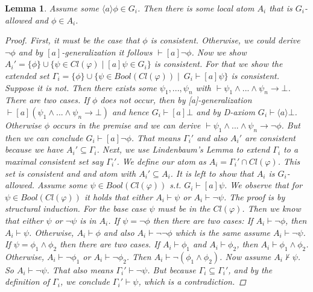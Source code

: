 \documentclass[11pt]{article}
\newtheorem{lemma}[theorem]{Lemma}
\theoremstyle{definition}
\theoremstyle{remark}
\begin{document}
\begin{lemma}
    Assume some $\langle a \rangle \phi \in G_i$. Then there is some local atom $A_i$ that is $G_i$-allowed and $\phi \in A_i$.

    \begin{proof}
        First, it must be the case that ${\phi}$ is consistent. Otherwise, we could derive $\neg \phi$ and by $[a]$-generalization it follows $\vdash [a] \neg \phi$. Now we show $A_i' = \{\phi\} \cup \{\psi \in Cl(\varphi) \mid [a] \psi \in G_i\}$ is consistent.
        For that we show the extended set $\Gamma_i = \{\phi\} \cup \{\psi  \in Bool(Cl(\varphi)) \mid \ G_i\vdash [a]\psi\}$ is consistent. Suppose it is not. Then there exists some $\psi_1,...,\psi_n$ with 
        $\vdash \psi_1 \land ... \land \psi_n \rightarrow \bot$. There are two cases. If $\phi$ does not occur, then by [a]-generalization $\vdash [a](\psi_1 \land ... \land \psi_n \rightarrow \bot)$ and hence $G_i \vdash [a] \bot$ and by D-axiom $G_i \vdash \langle a \rangle \bot$.
        Otherwise $\phi$ occurs in the premise and we can derive $\vdash \psi_1 \land ... \land \psi_n \rightarrow \neg \phi$. But then we can conclude $G_i \vdash [a] \neg \phi$. That means $\Gamma_i'$ and also $A_i'$ are consistent because we have $A_i' \subseteq \Gamma_i$. \newline
        Next, we use Lindenbaum's Lemma to extend $\Gamma_i$ to a maximal consistent set say $\Gamma_i'$. We define our atom as $A_i = \Gamma_i' \cap Cl(\varphi)$. This set is consistent and and atom with $A_i' \subseteq A_i$. It is left to show that $A_i$ is $G_i$-allowed.
        Assume some $\psi \in Bool(Cl(\varphi))$ s.t. $G_i \vdash [a]\psi$. We observe that for $\psi \in Bool(Cl(\varphi))$ it holds that either 
        $A_i \vdash \psi$ or $A_i \vdash \neg \psi$. The proof is by structural induction. For the base case $\psi$ must be in the $Cl(\varphi)$. Then we know that either $\psi$ or $\neg \psi$ is in $A_i$.
        If $\psi = \neg \phi$ then there are two cases: If $A_i \vdash \neg \phi$, then $A_i \vdash \psi$. Otherwise, $A_i \vdash \phi$ and also $A_i \vdash \neg \neg \phi$ which is the same assume
        $A_i \vdash \neg \psi$. If $\psi = \phi_1 \land \phi_2$ then there are two cases. If $A_i \vdash \phi_1$ and $A_i \vdash \phi_2$, then $A_i \vdash \phi_1 \land \phi_2$. Otherwise, $A_i \vdash \neg \phi_1$ or $A_i \vdash \neg \phi_2$. Then
        $A_i \vdash \neg (\phi_1 \land \phi_2)$.
        Now assume $A_i \nvdash \psi$. So $A_i \vdash \neg \psi$. That also means $\Gamma_i' \vdash \neg \psi$. But because $\Gamma_i \subseteq \Gamma_i'$, and by the definition of $\Gamma_i$, we conclude $\Gamma_i' \vdash \psi$, which is a contradiction.

    \end{proof}

\end{lemma}
\end{document}
